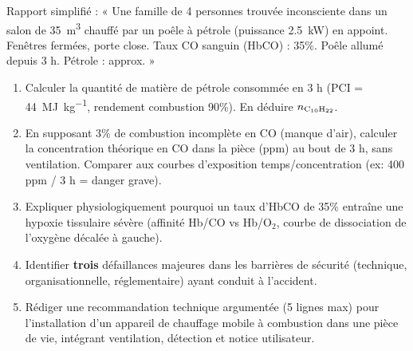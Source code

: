 \documentclass[11pt]{article}
\begin{document}
\begin{exercice}
Rapport simplifié : « Une famille de 4 personnes trouvée inconsciente dans un salon de \SI{35}{m^3} chauffé par un poêle à pétrole (puissance \SI{2,5}{kW}) en appoint. Fenêtres fermées, porte close. Taux CO sanguin (HbCO) : 35\%. Poêle allumé depuis 3 h. Pétrole :  approx. »
\begin{enumerate}
    \item Calculer la quantité de matière de pétrole consommée en 3 h (PCI  = \SI{44}{MJ.kg^{-1}}, rendement combustion 90\%). En déduire $n_{\ce{C10H22}}$.
    \item En supposant 3\% de combustion incomplète en CO (manque d'air), calculer la concentration théorique en CO dans la pièce (ppm) au bout de 3 h, sans ventilation. Comparer aux courbes d'exposition temps/concentration (ex: 400 ppm / 3 h = danger grave).
    \item Expliquer physiologiquement pourquoi un taux d'HbCO de 35\% entraîne une hypoxie tissulaire sévère (affinité Hb/CO vs Hb/O$_2$, courbe de dissociation de l'oxygène décalée à gauche).
    \item Identifier \textbf{trois} défaillances majeures dans les barrières de sécurité (technique, organisationnelle, réglementaire) ayant conduit à l'accident.
    \item Rédiger une recommandation technique argumentée (5 lignes max) pour l'installation d'un appareil de chauffage mobile à combustion dans une pièce de vie, intégrant ventilation, détection et notice utilisateur.
\end{enumerate}
\end{exercice}
\end{document}
